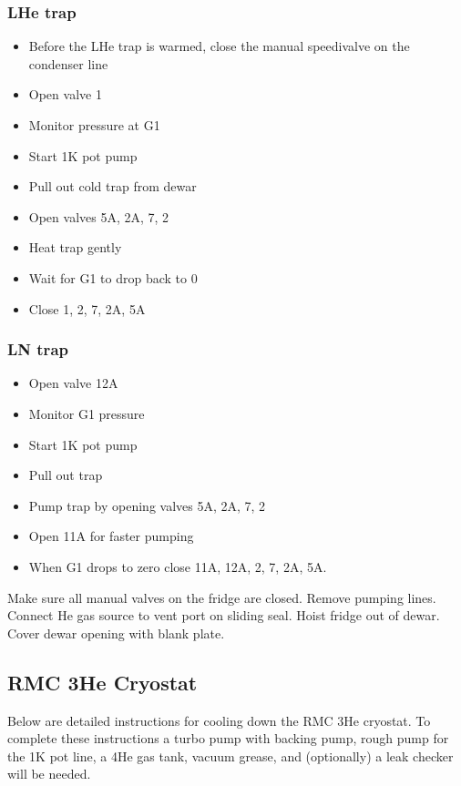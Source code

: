 \subsubsection*{LHe trap}

\begin{itemize}
\item Before the LHe trap is warmed, close the manual speedivalve on the condenser line
\item Open valve 1
\item Monitor pressure at G1
\item Start 1K pot pump
\item Pull out cold trap from dewar
\item Open valves 5A, 2A, 7, 2
\item Heat trap gently
\item Wait for G1 to drop back to 0
\item Close 1, 2, 7, 2A, 5A
\end{itemize}

\subsubsection*{LN trap}

\begin{itemize}
\item Open valve 12A
\item Monitor G1 pressure
\item Start 1K pot pump
\item Pull out trap
\item Pump trap by opening valves 5A, 2A, 7, 2
\item Open 11A for faster pumping
\item When G1 drops to zero close 11A, 12A, 2, 7, 2A, 5A.
\end{itemize}

Make sure all manual valves on the fridge are closed. Remove pumping lines. Connect He gas source to vent port on sliding seal. Hoist fridge out of dewar. Cover dewar opening with blank plate.

\subsection{RMC 3He Cryostat}
\label{sec:rmc}

Below are detailed instructions for cooling down the RMC 3He cryostat. To complete these instructions a turbo pump with backing pump, rough pump for the 1K pot line, a 4He gas tank, vacuum grease, and (optionally) a leak checker will be needed.


